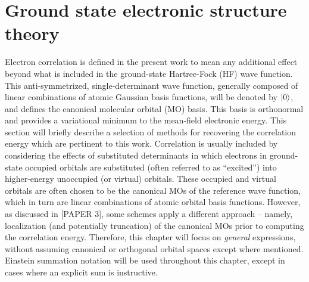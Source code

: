 \section{Ground state electronic structure theory} \label{se:est}
Electron correlation is defined in the present work to mean any additional effect beyond what is
included in the ground-state Hartree-Fock (HF) wave function. This anti-symmetrized, 
single-determinant wave function, generally composed of linear combinations of atomic Gaussian basis functions, will be denoted by $| 0 \rangle$, and defines the canonical molecular orbital (MO) basis.\cite{Szabo1996} 
This basis is orthonormal and provides a variational minimum to the mean-field electronic energy.
This section will briefly describe a selection of methods for recovering the correlation energy which are
pertinent to this work.
Correlation is usually included by considering the effects of substituted determinants in which electrons
in ground-state occupied orbitals are substituted (often referred to as ``excited'') into higher-energy unoccupied (or virtual) orbitals. 
These occupied and virtual orbitals are often chosen to be the canonical MOs of the reference 
wave function, which in turn are linear combinations of atomic orbital basis functions.
However, as discussed in [PAPER 3], some schemes apply a different approach -- namely, localization
(and potentially truncation) of the canonical MOs prior to computing the correlation energy. 
Therefore, this chapter will focus on \textit{general} expressions, without assuming canonical or 
orthogonal orbital spaces except where mentioned.   
Einstein summation notation will be used throughout this chapter, except in cases where an explicit sum
is instructive.

